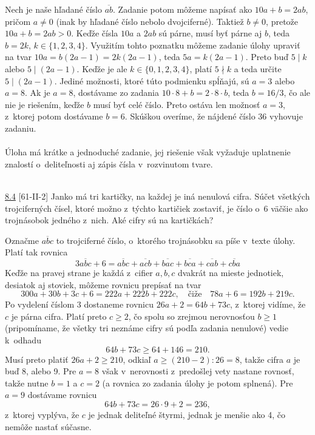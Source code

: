 \rie Nech je naše hľadané číslo $\overline{ab}$. Zadanie potom môžeme napísať ako $10a+b=2ab$, pričom $a\neq 0$ (inak by hľadané číslo nebolo dvojciferné). Taktiež $b\neq 0$, pretože $10a+b=2ab>0$. Keďže čísla $10a$ a $2ab$ sú párne, musí byť párne aj $b$, teda $b=2k$, $k \in \{1,2,3,4\}$. Využitím tohto poznatku môžeme zadanie úlohy upraviť na tvar $10a=b(2a-1)=2k(2a-1)$, teda $5a=k(2a-1)$. Preto buď $5\mid k$ alebo $5\mid (2a-1)$. Keďže je ale $k\in \{0, 1, 2, 3, 4\}$, platí $5\nmid k$ a teda určite $5 \mid (2a-1)$. Jediné možnosti, ktoré túto podmienku spĺňajú, sú $a=3$ alebo $a=8$. Ak je $a=8$, dostávame zo zadania $10\cdot 8 +b = 2\cdot 8 \cdot b$, teda $b=16/3$, čo ale nie je riešením, keďže $b$ musí byť celé číslo. Preto ostáva len možnosť $a=3$, z~ktorej potom dostávame $b=6$. Skúškou overíme, že nájdené číslo 36 vyhovuje zadaniu.\\
\\
\kom Úloha má krátke a jednoduché zadanie, jej riešenie však vyžaduje uplatnenie znalostí o~deliteľnosti aj zápis čísla v~rozvinutom tvare. \\
\\
\begin{tcolorbox}[breakable,notitle,boxrule=0pt,colback=light-gray,colframe=light-gray]\ul{8.4} [61-II-2] Janko má tri kartičky, na každej je iná nenulová cifra. Súčet všetkých trojciferných čísel, ktoré možno z~týchto kartičiek zostaviť, je číslo o~6 väčšie ako trojnásobok jedného z~nich. Aké cifry sú na kartičkách?

\end{tcolorbox}

\rie Označme $\overline{abc}$ to trojciferné číslo, o~ktorého trojnásobku sa píše v~texte úlohy. Platí tak rovnica
$$3\overline{abc} + 6 = \overline{abc} + \overline{acb}+ \overline{bac}+\overline{bca}+\overline{cab}+\overline{cba}$$  Keďže na pravej strane je každá z~cifier $a, b, c$ dvakrát na mieste jednotiek, desiatok aj
stoviek, môžeme rovnicu prepísať na tvar
$$300a + 30b + 3c + 6 = 222a + 222b + 222c, \quad \text{čiže} \quad 78a + 6 = 192b + 219c.$$
Po vydelení číslom 3 dostaneme rovnicu $26a + 2 = 64b + 73c$, z~ktorej vidíme, že $c$ je párna cifra. Platí preto $c \geq 2$, čo spolu so zrejmou nerovnosťou $b \geq 1$ (pripomíname, že všetky tri neznáme cifry sú podľa zadania nenulové) vedie k~odhadu $$ 64b + 73c \geq 64 + 146 = 210.$$
Musí preto platiť $26a + 2 \geq 210$, odkiaľ $a \geq (210 - 2) : 26 = 8$, takže cifra $a$ je buď 8, alebo 9. Pre $a = 8$ však v~nerovnosti z~predošlej vety nastane rovnosť, takže nutne $b = 1$ a $c = 2$ (a rovnica zo zadania úlohy je potom splnená). Pre $a = 9$ dostávame
rovnicu $$ 64b + 73c = 26 \cdot 9 + 2 = 236,$$
z~ktorej vyplýva, že $c$ je jednak deliteľné štyrmi, jednak je menšie ako 4, čo nemôže nastať súčasne.

